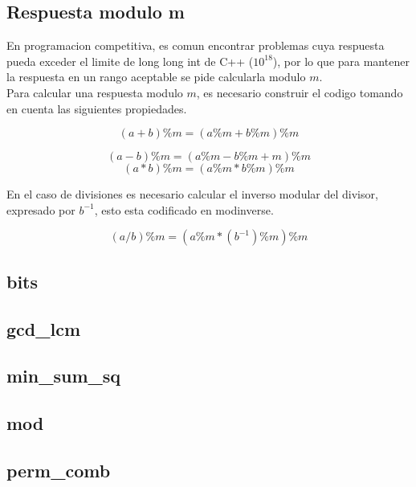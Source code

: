 \subsection{Respuesta modulo m}
\begin{justify}
En programacion competitiva, es comun encontrar problemas cuya respuesta pueda exceder el limite de long long int de C++ ($10^{18}$), por lo que para mantener la respuesta en un rango aceptable se pide calcularla modulo $m$.
\\
Para calcular una respuesta modulo $m$, es necesario construir el codigo tomando en cuenta las siguientes propiedades.
\end{justify}
\begin{equation*}
    (a+b)\%m = (a\%m + b\%m)\%m
\end{equation*}

\begin{equation*}
    (a-b)\%m = (a\%m - b\%m + m)\%m
\end{equation*}
\begin{equation*}
    (a*b)\%m = (a\%m * b\%m)\%m
\end{equation*}
\begin{justify}
En el caso de divisiones es necesario calcular el inverso modular del divisor, expresado por $b^{-1}$, esto esta codificado en modinverse.
\end{justify}
\begin{equation*}
    (a/b)\%m = (a\%m * (b^{-1})\%m)\%m
\end{equation*}

\subsection{bits}
\subsection{gcd\_lcm}
\subsection{min\_sum\_sq}
\subsection{mod}
\subsection{perm\_comb}


